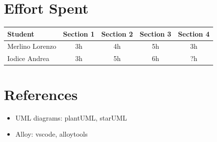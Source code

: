 \documentclass{article}
\begin{document}
\newpage
\section{Effort Spent}
\begin{center}
\begin{tabular}{||l|c|c|c|c||}
\hline
Student & Section 1 & Section 2 & Section 3 & Section 4
\\
\hline
Merlino Lorenzo & 3h & 4h & 5h & 3h
\\
\hline
Iodice Andrea & 3h & 5h & 6h & ?h
\\
\hline
\end{tabular}
\end{center}

\newpage
\section{References}
\begin{itemize}
\item UML diagrams: plantUML, starUML
\item Alloy: vscode, alloytools
\end{itemize}
\end{document}

